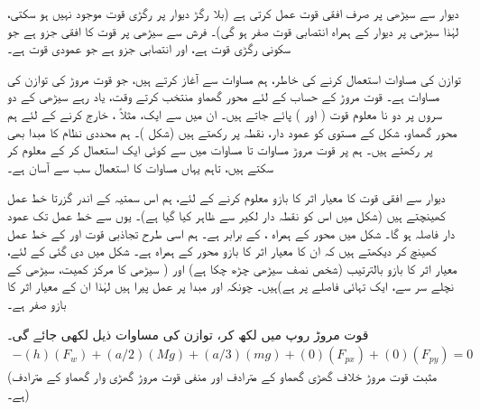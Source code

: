 دیوار سے سیڑھی پر صرف افقی قوت  عمل کرتی ہے (بلا رگڑ دیوار پر رگڑی قوت موجود نہیں ہو سکتی، لہٰذا  سیڑھی پر دیوار کے ہمراہ انتصابی قوت صفر ہو گی)۔ فرش سے سیڑھی پر  قوت  کا  افقی جزو  ہے جو سکونی رگڑی قوت ہے، اور انتصابی جزو   ہے  جو عمودی قوت ہے۔

توازن کی مساوات  استعمال کرنے کی خاطر،  ہم مساوات      سے آغاز کرتے ہیں، جو  قوت مروڑ کی توازن کی مساوات  ہے۔ قوت مروڑ کے حساب کے لئے محور گھماو منتخب کرتے وقت، یاد رہے سیڑھی کے دو سروں
 پر دو  نا معلوم  قوت ( اور ) پائے جاتے ہیں۔ ان میں سے ایک، مثلاً ، خارج کرنے کے لئے ہم محور گھماو، شکل کے مستوی کو عمود دار، نقطہ  پر رکھتے ہیں (شکل )۔ ہم محددی نظام کا مبدا بھی  پر رکھتے ہیں۔
  ہم   پر قوت مروڑ مساوات  تا مساوات   میں سے کوئی ایک استعمال کر کے معلوم کر سکتے ہیں، تاہم  یہاں مساوات    کا استعمال  سب سے آسان ہے۔ 
  
  دیوار سے افقی قوت  کا معیار اثر کا بازو  معلوم کرنے کے لئے، ہم اس سمتیہ  کے اندر گزرتا خط عمل کھینچتے ہیں (شکل  میں  اس کو نقطہ دار لکیر سے ظاہر کیا گیا ہے)۔ یوں  سے خط عمل تک عمود دار فاصلہ  ہو گا۔  شکل  میں      محور  کے ہمراہ ،  کے برابر ہے۔ ہم اسی طرح تجاذبی قوت  اور   کے خط عمل کھینچ کر دیکھتے ہیں کہ ان کا معیار اثر کا بازو محور  کے ہمراہ ہے۔ شکل  میں دی گئی  کے لئے، معیار اثر کا بازو بالترتیب   (شخص نصف سیڑھی چڑھ چکا ہے) اور   ( سیڑھی کا مرکز کمیت، سیڑھی کے نچلے سر سے،   ایک تہائی فاصلے پر ہے)ہیں۔ چونکہ  اور   مبدا پر عمل پیرا ہیں لہٰذا ان کے معیار اثر کا بازو صفر ہے۔
  
  قوت مروڑ  روپ میں لکھ کر، توازن کی مساوات  ذیل لکھی جائے گی۔
  \begin{align}\label{مساوات_توازن_سیڑھی_نمونی_الف}
  -(h)(F_w)+(a\!/\!2)(Mg)+(a\!/\!3)(mg)+(0)(F_{px})+(0)(F_{py})=0
  \end{align}
  (مثبت قوت مروڑ خلاف گھڑی گھماو کے مترادف اور منفی قوت مروڑ گھڑی وار گھماو کے مترادف ہے۔)
  
